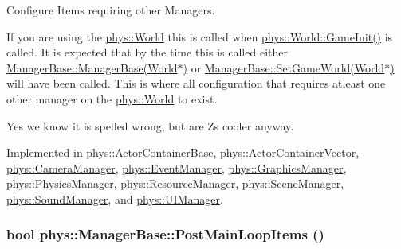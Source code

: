 Configure Items requiring other Managers. 

If you are using the \hyperlink{classphys_1_1World}{phys::World} this is called when \hyperlink{classphys_1_1World_a21cc36be08a61f40619584d4c438936b}{phys::World::GameInit()} is called. It is expected that by the time this is called either \hyperlink{classphys_1_1ManagerBase_ab9ad12416f771d95fe8a6d953923c634}{ManagerBase::ManagerBase(World$\ast$)} or \hyperlink{classphys_1_1ManagerBase_a97eb1e77c1f7a0925fc623836368a262}{ManagerBase::SetGameWorld(World$\ast$)} will have been called. This is where all configuration that requires atleast one other manager on the \hyperlink{classphys_1_1World}{phys::World} to exist.\par
\par
 Yes we know it is spelled wrong, but are Zs cooler anyway. 

Implemented in \hyperlink{classphys_1_1ActorContainerBase_af36d5866e0ee9f6f450a4e62642e0928}{phys::ActorContainerBase}, \hyperlink{classphys_1_1ActorContainerVector_adcebf4329a587669f74e1eacc1e6912c}{phys::ActorContainerVector}, \hyperlink{classphys_1_1CameraManager_a5e956b61fa341ae576d8d160da518488}{phys::CameraManager}, \hyperlink{classphys_1_1EventManager_a51afdd83f44f461dfac5c9eca5883ea0}{phys::EventManager}, \hyperlink{classphys_1_1GraphicsManager_a554572de5d1cdce37aa1760d6e6e039c}{phys::GraphicsManager}, \hyperlink{classphys_1_1PhysicsManager_a28885be750bb763d957f122593815388}{phys::PhysicsManager}, \hyperlink{classphys_1_1ResourceManager_a9be3250f1f1153c9e079f82736eb00a8}{phys::ResourceManager}, \hyperlink{classphys_1_1SceneManager_aa13b380a4e38f706a1977237fc4b165e}{phys::SceneManager}, \hyperlink{classphys_1_1SoundManager_ae6d3957f965b54e06ec540e903cec68d}{phys::SoundManager}, and \hyperlink{classphys_1_1UIManager_af04e60c4f09c114ec3bf32babdb64ab7}{phys::UIManager}.

\hypertarget{classphys_1_1ManagerBase_afc3572602f96bdeb8215c386ff870820}{
\subsubsection[{PostMainLoopItems}]{\setlength{\rightskip}{0pt plus 5cm}bool phys::ManagerBase::PostMainLoopItems ()}}
\label{d2/de3/classphys_1_1ManagerBase_afc3572602f96bdeb8215c386ff870820}


